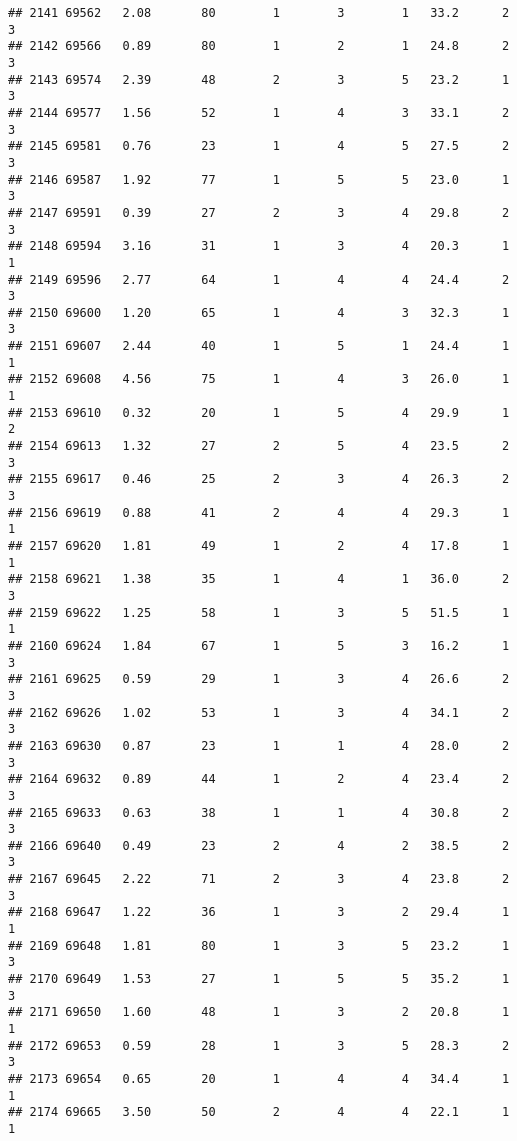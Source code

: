 \documentclass[
]{article}
\begin{document}
\begin{verbatim}
## 2141 69562   2.08       80        1        3        1   33.2      2      3
## 2142 69566   0.89       80        1        2        1   24.8      2      3
## 2143 69574   2.39       48        2        3        5   23.2      1      3
## 2144 69577   1.56       52        1        4        3   33.1      2      3
## 2145 69581   0.76       23        1        4        5   27.5      2      3
## 2146 69587   1.92       77        1        5        5   23.0      1      3
## 2147 69591   0.39       27        2        3        4   29.8      2      3
## 2148 69594   3.16       31        1        3        4   20.3      1      1
## 2149 69596   2.77       64        1        4        4   24.4      2      3
## 2150 69600   1.20       65        1        4        3   32.3      1      3
## 2151 69607   2.44       40        1        5        1   24.4      1      1
## 2152 69608   4.56       75        1        4        3   26.0      1      1
## 2153 69610   0.32       20        1        5        4   29.9      1      2
## 2154 69613   1.32       27        2        5        4   23.5      2      3
## 2155 69617   0.46       25        2        3        4   26.3      2      3
## 2156 69619   0.88       41        2        4        4   29.3      1      1
## 2157 69620   1.81       49        1        2        4   17.8      1      1
## 2158 69621   1.38       35        1        4        1   36.0      2      3
## 2159 69622   1.25       58        1        3        5   51.5      1      1
## 2160 69624   1.84       67        1        5        3   16.2      1      3
## 2161 69625   0.59       29        1        3        4   26.6      2      3
## 2162 69626   1.02       53        1        3        4   34.1      2      3
## 2163 69630   0.87       23        1        1        4   28.0      2      3
## 2164 69632   0.89       44        1        2        4   23.4      2      3
## 2165 69633   0.63       38        1        1        4   30.8      2      3
## 2166 69640   0.49       23        2        4        2   38.5      2      3
## 2167 69645   2.22       71        2        3        4   23.8      2      3
## 2168 69647   1.22       36        1        3        2   29.4      1      1
## 2169 69648   1.81       80        1        3        5   23.2      1      3
## 2170 69649   1.53       27        1        5        5   35.2      1      3
## 2171 69650   1.60       48        1        3        2   20.8      1      1
## 2172 69653   0.59       28        1        3        5   28.3      2      3
## 2173 69654   0.65       20        1        4        4   34.4      1      1
## 2174 69665   3.50       50        2        4        4   22.1      1      1

\end{verbatim}
\end{document}
